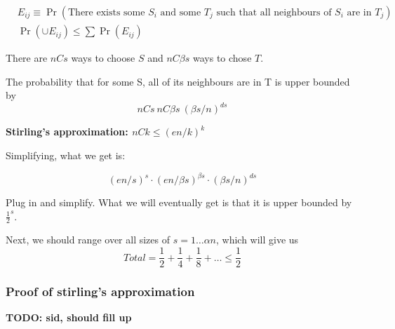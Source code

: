 \begin{align*}
&E_{ij} \equiv \Pr(\text{There exists some $S_i$ and some $T_j$ such that all neighbours of $S_i$ are in $T_j$}) \\
&\Pr (\cup E_{ij}) \leq \sum \Pr(E_{ij})
\end{align*}

There are $nCs$ ways to choose $S$ and $nC\beta s$ ways to chose $T$.

The probability that for some S, all of its neighbours are in T is upper
bounded by $$nCs~nC \beta s~ (\beta s/n)^{ds}$$

\textbf{Stirling's approximation: $nCk \leq (en/k)^k$}



Simplifying, what we get is:

$$
(en/s)^s \cdot (en/\beta s)^{\beta s} \cdot (\beta s / n)^{ds}
$$

Plug in and simplify. What we will eventually get is that it is
upper bounded by $\frac{1}{2}^s$.

Next, we should range over all sizes of $s=1\dots\alpha n$, which will
give us $$Total = \frac{1}{2} + \frac{1}{4} + \frac{1}{8} + \dots \leq \frac{1}{2}$$

\subsubsection{Proof of stirling's approximation}
\textbf{TODO: sid, should fill up}
